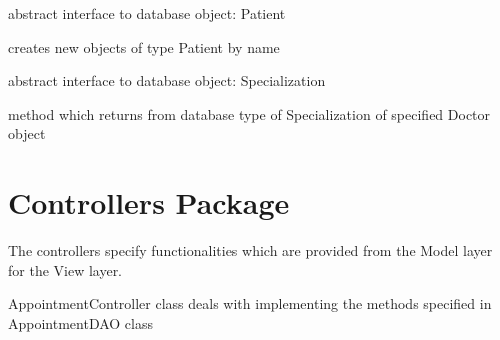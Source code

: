 \documentclass[letterpaper,10pt,english]{sphinxmanual}
\begin{document}

\begin{fulllineitems}
\label{dao:doctors.dao.PatientDAO}
abstract interface to database object: Patient

\begin{fulllineitems}
\label{dao:doctors.dao.PatientDAO.create}
creates new objects of type Patient by name

\end{fulllineitems}


\end{fulllineitems}


\begin{fulllineitems}
\label{dao:doctors.dao.SpecializationDAO}
abstract interface to database object: Specialization

\begin{fulllineitems}
\label{dao:doctors.dao.SpecializationDAO.getByDoctor}
method which returns from database type of Specialization of specified Doctor object

\end{fulllineitems}


\end{fulllineitems}



\chapter{Controllers Package}
\label{controllers:controllers-package}\label{controllers::doc}
The controllers specify functionalities which are provided from the Model layer for the View layer.
\label{controllers:module-doctors.controllers}

\begin{fulllineitems}
\label{controllers:doctors.controllers.AppointmentController}
AppointmentController class deals with implementing the methods specified in AppointmentDAO class

\end{fulllineitems}
\end{document}
